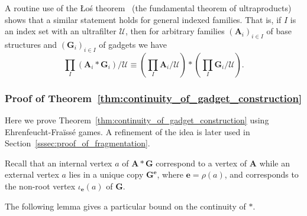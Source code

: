 \documentclass[11pt]{article}
\theoremstyle{plain}
\theoremstyle{definition}
\theoremstyle{remark}
\newcommand{\str}[1]{\mathbf{#1}}
\newcommand{\Los}{\L{}o\'{s}}
\newcommand{\tpl}[1]{{\bm{#1}}}
\begin{document}
A routine use of the \Los{} theorem~\cite{los} (the fundamental theorem of ultraproducts) shows that a similar statement holds for general indexed families.
That is, if $I$ is an index set with an ultrafilter $\mathcal{U}$, then for arbitrary families $(\str{A}_i)_{i \in I}$ of base structures and $(\str{G}_i)_{i \in I}$ of gadgets we have
\[
    \prod_I (\str{A}_i * \str{G}_i) / \mathcal{U} 
    \equiv 
    \left( \prod_I \str{A}_i / \mathcal{U} \right) * \left( \prod_I \str{G}_i / \mathcal{U} \right)
    .
\]

\subsubsection{Proof of Theorem~\ref{thm:continuity_of_gadget_construction}}\label{sssec:proof_ef_games}

Here we prove Theorem~\ref{thm:continuity_of_gadget_construction} using Ehrenfeucht-Fra\"{i}ss\'{e} games.
A refinement of the idea is later used in Section~\ref{sssec:proof_of_fragmentation}.

Recall that an internal vertex $a$ of $\str{A} * \str{G}$ correspond to a vertex of $\str{A}$ while an external vertex $a$ lies in a unique copy $\str{G}^\tpl{e}$, where $\tpl{e} = \rho(a)$, and corresponds to the non-root vertex $\iota_\tpl{e}(a)$ of $\str{G}$.

The following lemma gives a particular bound on the continuity of $*$.
\end{document}
